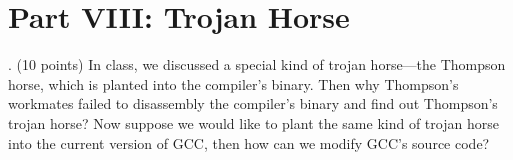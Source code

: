 \documentclass[a4paper, 10pt]{article}
\begin{document}
\newpage



\section*{Part VIII: Trojan Horse}
. (10 points) In class, we discussed a special kind of trojan
horse---the Thompson horse, which is planted into the compiler's binary. Then
why Thompson's workmates failed to disassembly the compiler's binary and
find out Thompson's trojan horse? Now suppose we would like to plant the
same kind of trojan horse into the current version of GCC, then how can
we modify GCC's source code?
\end{document}
